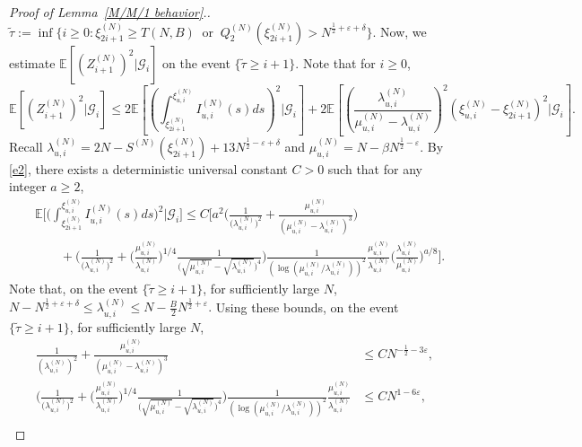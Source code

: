 \documentclass[11pt, reqno]{article}
\numberwithin{equation}{section}
\numberwithin{theorem}{section}
\begin{document}
\begin{appendix}
\begin{proof}[Proof of Lemma~\ref{M/M/1 behavior}.]
$
\tilde \tau := \inf\{i \ge 0: \xi^{(N)}_{2i+1} \ge T(N,B)  \ \text{ or } \ Q^{(N)}_2(\xi^{(N)}_{2i+1}) >  N^{\frac{1}{2}+\varepsilon+\delta}\}.
$
Now, we estimate $\mathbb{E}\left[(Z^{(N)}_{i+1})^2 \vert \mathcal{G}_{i}\right]$ on the event $\{\tilde \tau \ge i+1\}$. Note that for $i \ge 0$,
\begin{equation}\label{qv1}
\mathbb{E}\left[(Z^{(N)}_{i+1})^2 \vert \mathcal{G}_{i}\right] \le 2\mathbb{E}\left[\left(\int_{\xi^{(N)}_{2i+1}}^{\xi^{(N)}_{u,i}}I^{(N)}_{u,i}(s)ds\right)^2 \Big| \mathcal{G}_{i}\right] + 2\mathbb{E}\left[\left(\frac{\lambda^{(N)}_{u,i}}{\mu^{(N)}_{u,i}-\lambda^{(N)}_{u,i}}\right)^2\left(\xi^{(N)}_{u,i} - \xi^{(N)}_{2i+1}\right)^2 \Big| \mathcal{G}_{i}\right].
\end{equation}
Recall $\lambda^{(N)}_{u,i}=2N-S^{(N)}(\xi^{(N)}_{2i+1})+ 13 N^{\frac{1}{2}-\varepsilon+\delta}$ and
 $\mu^{(N)}_{u,i}=N-\beta N^{\frac{1}{2}-\varepsilon}$. By \eqref{e2}, there exists a deterministic universal constant $C>0$ such that for any integer $a \ge 2$,
\begin{align*}
 &\mathbb{E}\bigg[\bigg(\int_{\xi^{(N)}_{2i+1}}^{\xi^{(N)}_{u,i}}I^{(N)}_{u,i}(s)ds\bigg)^2 \Big| \mathcal{G}_{i}\bigg]\le C\bigg[ a^2 \bigg(\frac{1}{\big(\lambda^{(N)}_{u,i}\big)^2} + \frac{\mu^{(N)}_{u,i}}{(\mu^{(N)}_{u,i} - \lambda^{(N)}_{u,i})^3}\bigg)\nonumber\\
 &\qquad + \bigg(\frac{1}{\big(\lambda^{(N)}_{u,i}\big)^2} + \bigg(\frac{\mu^{(N)}_{u,i}}{\lambda^{(N)}_{u,i}}\bigg)^{1/4}\frac{1}{\big(\sqrt{\mu^{(N)}_{u,i}} - \sqrt{\lambda^{(N)}_{u,i}}\big)^4}\bigg)\frac{1}{(\log(\mu^{(N)}_{u,i}/\lambda^{(N)}_{u,i}))^2} \frac{\mu^{(N)}_{u,i}}{\lambda^{(N)}_{u,i}} \bigg(\frac{\lambda^{(N)}_{u,i}}{\mu^{(N)}_{u,i}}\bigg)^{a/8}\bigg].
 \end{align*}
 Note that, on the event $\{\tilde \tau \ge i+1\}$, for sufficiently large $N$,
$
N - N^{\frac{1}{2} +\varepsilon + \delta} \le  \lambda^{(N)}_{u,i} \le N - \frac{B}{2}  N^{\frac{1}{2} +\varepsilon}.
$
Using these bounds, on the event $\{\tilde \tau \ge i+1\}$, for sufficiently large $N$,
\begin{align*}
\frac{1}{\left(\lambda^{(N)}_{u,i}\right)^2} + \frac{\mu^{(N)}_{u,i}}{(\mu^{(N)}_{u,i} - \lambda^{(N)}_{u,i})^3} &\le CN^{-\frac{1}{2} - 3\varepsilon},\\
\bigg(\frac{1}{\big(\lambda^{(N)}_{u,i}\big)^2} + \bigg(\frac{\mu^{(N)}_{u,i}}{\lambda^{(N)}_{u,i}}\bigg)^{1/4}\frac{1}{\big(\sqrt{\mu^{(N)}_{u,i}} - \sqrt{\lambda^{(N)}_{u,i}}\big)^4}\bigg)\frac{1}{(\log(\mu^{(N)}_{u,i}/\lambda^{(N)}_{u,i}))^2} \frac{\mu^{(N)}_{u,i}}{\lambda^{(N)}_{u,i}}  &\le CN^{1-6\varepsilon},\\

\end{align*}
\end{proof}
\end{appendix}
\end{document}
